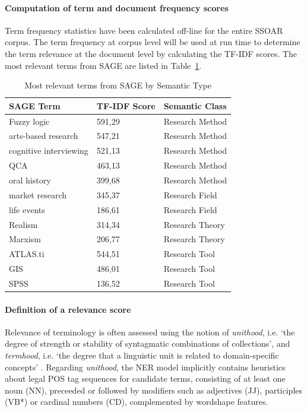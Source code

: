 \paragraph{Computation of term and document frequency scores}%
Term frequency statistics have been calculated off-line for the entire SSOAR corpus.
The term frequency at corpus level will be used at run time to determine the term relevance at the document level by calculating the TF-IDF scores. The most relevant terms from SAGE are listed in Table~\ref{tab:SAGET}.
\begin{table}
\center
\small
  \caption{Most relevant terms from SAGE by Semantic Type}
\begin{tabular}{lll}
  \label{tab:SAGET}
  \textbf{SAGE Term} & \textbf{TF-IDF Score}  & \textbf{Semantic Class}   \\ \hline  
Fuzzy logic	  &	591,29  &		Research Method  \\
arts-based research	 &	547,21  &		Research Method \\
cognitive interviewing  &		521,13  &		Research Method \\  
QCA	 &	463,13  &		Research Method   \\ 
oral history	 &	399,68  &		Research Method \\ \hline  
market research  &		345,37  &		Research Field \\
life events  &		186,61  &		Research Field \\ \hline 
Realism  &		314,34  &		Research Theory \\
Marxism  &		206,77  &		Research Theory \\ \hline  
ATLAS.ti  &		544,51  &		Research Tool\\
GIS	 &	486,01  &		Research Tool\\
SPSS	  &	136,52  &		Research Tool \\ \hline  
  
\end{tabular}
\end{table}


\paragraph{Definition of a relevance score}%
\label{para:relscore}
Relevance of terminology is often assessed using the notion of 
\textit{unithood}, i.e. `the degree of strength or stability of syntagmatic combinations of collections', and 
\textit{termhood}, i.e. `the degree that a linguistic unit is related to domain-specific concepts' \cite{kageura1996methods}.
Regarding \textit{unithood}, the NER model implicitly contains heuristics about legal POS tag sequences for candidate terms, 
consisting of at least one noun (NN), preceeded or followed by modifiers such as adjectives (JJ), participles (VB*) or cardinal numbers (CD), complemented by wordshape features.

